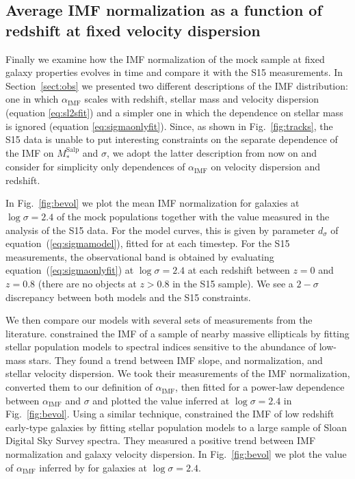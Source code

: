 \documentclass[usenatbib]{mnras}
\def\msalp{M_*^{\mathrm{Salp}}}
\def\aimf{\alpha_{\mathrm{IMF}}}
\def\Sref#1{Section~\ref{#1}\xspace}
\def\Fref#1{Fig.~\ref{#1}\xspace}
\def\Eref#1{equation~(\ref{#1})\xspace}
\begin{document}
\subsection{Average IMF normalization as a function of redshift at fixed velocity dispersion}

Finally we examine how the IMF normalization of the mock sample at fixed galaxy properties evolves in time and compare it with the S15 measurements.
In \Sref{sect:obs} we presented two different descriptions of the IMF distribution: one in which $\aimf$ scales with redshift, stellar mass and velocity dispersion (equation \ref{eq:sl2sfit}) and a simpler one in which the dependence on stellar mass is ignored (equation \ref{eq:sigmaonlyfit}).
Since, as shown in \Fref{fig:tracks}, the S15 data is unable to put interesting constraints on the separate dependence of the IMF on $\msalp$ and $\sigma$, we adopt the latter description from now on and consider for simplicity only dependences of $\aimf$ on velocity dispersion and redshift.

In \Fref{fig:bevol} we plot the mean IMF normalization for galaxies at $\log{\sigma}=2.4$ of the mock populations together with the value measured in the analysis of the S15 data.
For the model curves, this is given by parameter $d_\sigma$ of \Eref{eq:sigmamodel}, fitted for at each timestep. For the S15 measurements, the observational band is obtained by evaluating \Eref{eq:sigmaonlyfit} at $\log{\sigma}=2.4$ at each redshift between $z=0$ and $z=0.8$ (there are no objects at $z>0.8$ in the S15 sample).  
We see a $2-\sigma$ discrepancy between both models and the
S15 constraints. 

We then compare our models with several sets of measurements from the
literature.  
\citet{CvD12} constrained the IMF of a sample of nearby massive
ellipticals by fitting stellar population models to spectral indices
sensitive to the abundance of low-mass stars.  They found a trend
between IMF slope, and normalization, and stellar velocity
dispersion. We took their measurements of the IMF normalization,
converted them to our definition of $\aimf$, then fitted
for a power-law dependence between $\aimf$ and $\sigma$ and plotted
the value inferred at $\log{\sigma}=2.4$ in \Fref{fig:bevol}.  Using a
similar technique, \citet{Spi++14} constrained the IMF of low redshift
early-type galaxies by fitting stellar population models to a large
sample of Sloan Digital Sky Survey spectra.  They measured a positive
trend between IMF normalization and galaxy velocity dispersion. In
\Fref{fig:bevol} we plot the value of $\aimf$ inferred by
\citet{Spi++14} for galaxies at $\log{\sigma} = 2.4$.
\end{document}
